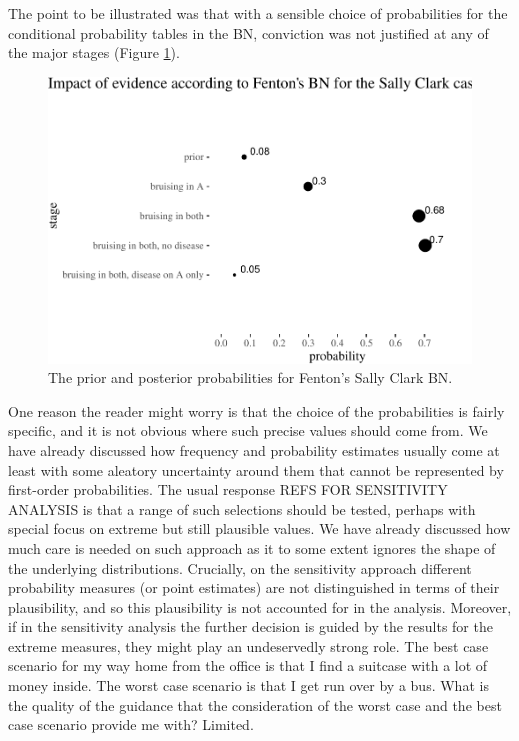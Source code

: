 \documentclass[
  10pt,
  dvipsnames,enabledeprecatedfontcommands]{scrartcl}
\begin{document}
The point to be illustrated was that with a sensible choice of
probabilities for the conditional probability tables in the BN,
conviction was not justified at any of the major stages (Figure
\ref{fig:SCfentonTable}).

\begin{figure}

\begin{center}\includegraphics[width=1\linewidth]{chapter-outline_files/figure-latex/SCfentonTable2-1} \end{center}

\caption{The prior and posterior probabilities for Fenton's Sally Clark BN.}

\label{fig:SCfentonTable}

\end{figure}

One reason the reader might worry is that the choice of the
probabilities is fairly specific, and it is not obvious where such
precise values should come from. We have already discussed how frequency
and probability estimates usually come at least with some aleatory
uncertainty around them that cannot be represented by first-order
probabilities. The usual response REFS FOR SENSITIVITY ANALYSIS is that
a range of such selections should be tested, perhaps with special focus
on extreme but still plausible values. We have already discussed how
much care is needed on such approach as it to some extent ignores the
shape of the underlying distributions. Crucially, on the sensitivity
approach different probability measures (or point estimates) are not
distinguished in terms of their plausibility, and so this plausibility
is not accounted for in the analysis. Moreover, if in the sensitivity
analysis the further decision is guided by the results for the extreme
measures, they might play an undeservedly strong role. The best case
scenario for my way home from the office is that I find a suitcase with
a lot of money inside. The worst case scenario is that I get run over by
a bus. What is the quality of the guidance that the consideration of the
worst case and the best case scenario provide me with? Limited.
\end{document}

